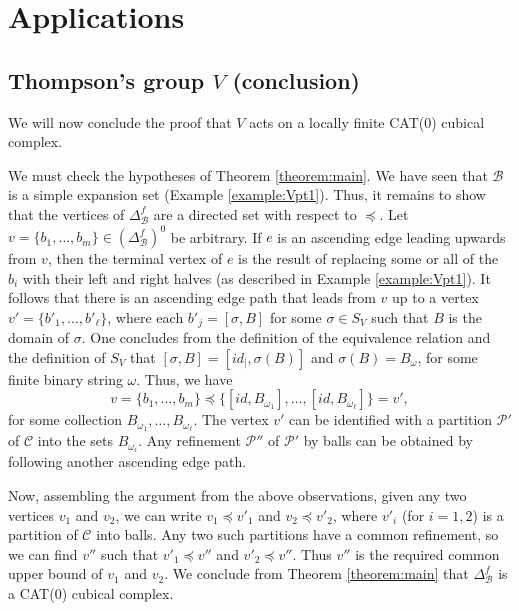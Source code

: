 \documentclass{amsart}
\newtheorem{standing assumption}[theorem]{Standing Assumption}
\begin{document}
\section{Applications} \label{section:apps}



\subsection{Thompson's group $V$ (conclusion)} \label{subsection:V}

We will now conclude the proof that $V$ acts on a locally finite CAT(0) cubical complex. 

We must check the hypotheses of Theorem \ref{theorem:main}. We have seen that $\mathcal{B}$ is a simple expansion set (Example \ref{example:Vpt1}). Thus, it remains to show that the vertices
of $\Delta^{f}_{\mathcal{B}}$ are a directed set with respect to $\preceq$. 
Let $v = \{ b_{1}, \ldots, b_{m} \} \in \left(\Delta^{f}_{\mathcal{B}}\right)^{0}$ be arbitrary. If $e$ is an ascending edge leading upwards from $v$, then the terminal vertex of $e$ is the result of replacing 
some or all of the $b_{i}$ with their left and right halves (as described in Example \ref{example:Vpt1}).  
It follows that there is an ascending edge path that leads from $v$ up to a vertex
$v' = \{ b'_{1}, \ldots, b'_{\ell} \}$, where each $b'_{j} = [\sigma,B]$ for some 
$\sigma \in S_{V}$ such that $B$ is the domain of $\sigma$. One concludes from the definition of the equivalence relation and the definition of $S_{V}$ that $[\sigma,B] = [id_{\mid}, \sigma(B)]$ and $\sigma(B) = B_{\omega}$, for some finite binary string $\omega$. Thus, we have 
\[ v = \{ b_{1}, \ldots, b_{m} \} \preceq \{ [id, B_{\omega_{1}}], \ldots, [id, B_{\omega_{\ell}}] \} = v', \]
for some collection $B_{\omega_{1}}, \ldots, B_{\omega_{\ell}}$. 
The vertex $v'$ can be identified with a partition $\mathcal{P}'$ of $\mathcal{C}$ into the sets $B_{\omega_{i}}$.  Any refinement $\mathcal{P}''$ of $\mathcal{P}'$ by balls
can be obtained by following another ascending edge path.

Now, assembling the argument from the above observations, given any two vertices $v_{1}$ and $v_{2}$, we can write $v_{1} \preceq v'_{1}$ and
$v_{2} \preceq v'_{2}$, where $v'_{i}$ (for $i=1,2$) is a partition of $\mathcal{C}$ into balls. Any two such partitions have a common refinement, so we can find $v''$ such that $v'_{1} \preceq v''$ and
$v'_{2} \preceq v''$. Thus $v''$ is the required common upper bound of $v_{1}$ and $v_{2}$.
We  conclude from Theorem \ref{theorem:main} that $\Delta^{f}_{\mathcal{B}}$ is a CAT(0) cubical complex. 
\end{document}
